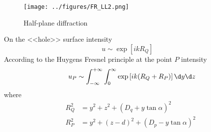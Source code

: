 \hspace{-1cm}
\begin{minipage}[t]{0.4\textwidth}
\begin{figure}[h]
    \centering
    \texttt{[image: ../figures/FR\_LL2.png]}
    \caption{\small Half-plane diffraction}
\end{figure}

\end{minipage}
\hfill
\begin{minipage}[t]{0.55\textwidth}
On the <<hole>> surface intensity
\begin{equation*}
    u \sim \exp\left[
        i k R_Q
    \right]
\end{equation*}
According to the Huygens Fresnel principle at the point $P$ intensity
\begin{equation*}
    \ \ \ \ u_P \sim 
    \int_{-\infty}^{+\infty} \int_0^{\infty}
    \exp\left[
        i k (R_Q + R_P)
    \right] \d y \d z
\end{equation*}
where
\begin{align*}
    \ \ \ \ R_Q^2 &= y^2 + z^2 + (D_q + y \tan \alpha)^2 \\
    \ \ \ \ R_P^2 &= y^2 + (z-d)^2 + (D_p - y \tan \alpha)^2
\end{align*}

\end{minipage}